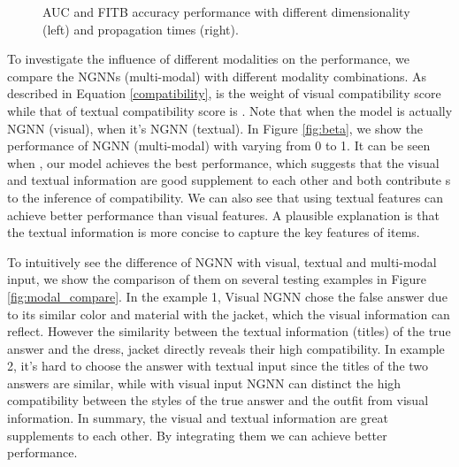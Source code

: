 \documentclass[sigconf]{acmart}
\begin{document}
\begin{figure}[hbtp]
\centering

\caption{AUC and FITB accuracy performance with different dimensionality  (left) and propagation times  (right).}
\label{fig:performance}
\end{figure}

To investigate the influence of different modalities on the performance, we compare the NGNNs (multi-modal) with different modality combinations.
As described in Equation \ref{compatibility},  is the weight of visual compatibility score while that of textual compatibility score is . Note that when  the model is actually NGNN (visual), when  it's NGNN (textual).
In Figure \ref{fig:beta}, we show the performance of NGNN (multi-modal) with  varying from 0 to 1.
It can be seen when , our model achieves the best performance, which suggests that the visual and textual information are good supplement to each other and both contribute s to the inference of compatibility. We can also see that using textual features can achieve better performance than visual features. A plausible explanation is that the textual information is more concise to capture the key features of items.

To intuitively see the difference of NGNN with visual, textual and multi-modal input, we show the comparison of them on several testing examples in Figure \ref{fig:modal_compare}.
In the example 1, Visual NGNN chose the false answer due to its similar color and material with the jacket, which the visual information can reflect. However the similarity between the textual information (titles) of the true answer and the dress, jacket directly reveals their high compatibility.
In example 2, it's hard to choose the answer with textual input since the titles of the two answers are similar, while with visual input  NGNN can distinct the high compatibility between the styles of the true answer and the outfit from visual information.
In summary, the visual and textual information are great supplements to each other. By integrating them we can achieve better performance.
\end{document}
